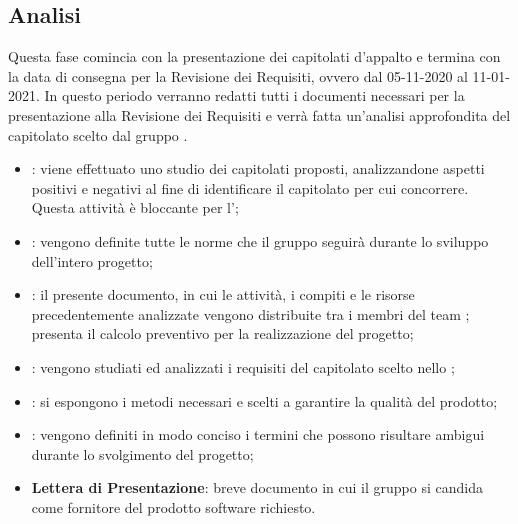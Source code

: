 \subsection{Analisi}
Questa fase comincia con la presentazione dei capitolati d'appalto e termina con la data di consegna per la Revisione dei Requisiti, ovvero dal 05-11-2020 al 11-01-2021.
In questo periodo verranno redatti tutti i documenti necessari per la presentazione alla Revisione dei Requisiti e verrà fatta un'analisi approfondita del capitolato scelto dal gruppo \Gruppo{}.
\begin{itemize}
\item \textbf{\SdF}: viene effettuato uno studio dei capitolati proposti, analizzandone aspetti positivi e negativi al fine di identificare il capitolato per cui concorrere. Questa attività è bloccante per l'\AdR ;
\item \textbf{\NdP}: vengono definite tutte le norme che il gruppo \Gruppo seguirà durante lo sviluppo dell'intero progetto;
\item \textbf{\PdP}: il presente documento, in cui le attività, i compiti\glo{} e le risorse precedentemente analizzate vengono distribuite tra i membri del team \Gruppo{}; presenta il calcolo preventivo per la realizzazione del progetto;
\item \textbf{\AdR}: vengono studiati ed analizzati i requisiti del capitolato\glo{} scelto nello \SdF;
\item \textbf{\PdQ}: si espongono i metodi necessari e scelti a garantire la qualità del prodotto;
\item \textbf{\Glossario}: vengono definiti in modo conciso i termini che possono risultare ambigui durante lo svolgimento del progetto;
\item \textbf{Lettera di Presentazione}: breve documento in cui il gruppo \Gruppo{} si candida come fornitore del prodotto software richiesto.
\end{itemize}
